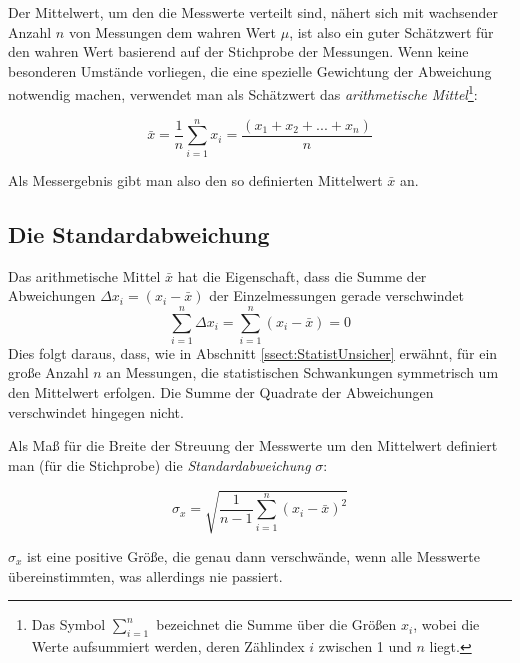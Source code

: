 Der Mittelwert, um den die Messwerte verteilt sind, nähert sich mit wachsender Anzahl $n$ von Messungen dem wahren Wert $\mu$, ist also ein guter Schätzwert für den wahren Wert basierend auf der Stichprobe der Messungen. Wenn keine besonderen Umstände vorliegen, die eine spezielle Gewichtung der Abweichung notwendig machen, verwendet man als Schätzwert das \textit{arithmetische Mittel}\footnote{Das Symbol $\sum_{i=1}^n$ bezeichnet die Summe über die Größen $x_i$, wobei die Werte aufsummiert werden, deren Zählindex $i$ zwischen 1 und $n$ liegt.}:
\begin{important}
	\begin{equation}
		\bar{x} = \frac{1}{n}\sum^n_{i=1} x_i = \frac{\left(x_1 + x_2 + ... + x_n\right)}{n} 
	\end{equation}
\end{important}

Als Messergebnis gibt man also den so definierten Mittelwert $\bar{x}$ an.

\subsection{Die Standardabweichung}

Das arithmetische Mittel $\bar{x}$ hat die Eigenschaft, dass die Summe der Abweichungen $\Delta x_i = \left( x_i - \bar{x}\right)$ der Einzelmessungen gerade verschwindet
\begin{equation}
	\sum^n_{i=1} \Delta x_i = \sum^n_{i=1} \left(x_i - \bar{x}\right) = 0
\end{equation}
Dies folgt daraus, dass, wie in Abschnitt \ref{ssect:StatistUnsicher} erwähnt, für ein große Anzahl $n$ an Messungen, die statistischen Schwankungen symmetrisch um den Mittelwert erfolgen. Die Summe der Quadrate der Abweichungen verschwindet hingegen nicht.

Als Maß für die Breite der Streuung der Messwerte um den Mittelwert definiert man (für die Stichprobe) die \textit{Standardabweichung} $\sigma$:
\begin{important}
	\begin{equation}
		\sigma_x = \sqrt{\frac{1}{n-1}\sum^n_{i=1}\left(x_i - \bar{x}\right)^2}
	\end{equation}
\end{important}

$\sigma_x$ ist eine positive Größe, die genau dann verschwände, wenn alle Messwerte übereinstimmten, was allerdings nie passiert. 

